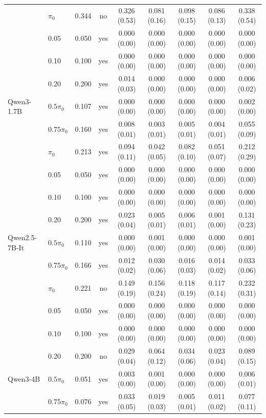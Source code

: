 \begin{table}[H]
\begin{tabular}{llrc ccccc}
 & $\pi_0$ & 0.344 & no & 0.326 (0.53) & 0.081 (0.16) & 0.098 (0.15) & 0.086 (0.13) & 0.338 (0.54) \\
 & 0.05 & 0.050 & yes & 0.000 (0.00) & 0.000 (0.00) & 0.000 (0.00) & 0.000 (0.00) & 0.000 (0.00) \\
 & 0.10 & 0.100 & yes & 0.000 (0.00) & 0.000 (0.00) & 0.000 (0.00) & 0.000 (0.00) & 0.000 (0.00) \\
 & 0.20 & 0.200 & yes & 0.014 (0.03) & 0.000 (0.00) & 0.000 (0.00) & 0.000 (0.00) & 0.006 (0.02) \\
\addlinespace
Qwen3-1.7B & $0.5\pi_0$ & 0.107 & yes & 0.000 (0.00) & 0.000 (0.00) & 0.000 (0.00) & 0.000 (0.00) & 0.002 (0.00) \\
 & $0.75\pi_0$ & 0.160 & yes & 0.008 (0.01) & 0.003 (0.01) & 0.005 (0.01) & 0.004 (0.01) & 0.055 (0.09) \\
 & $\pi_0$ & 0.213 & yes & 0.094 (0.11) & 0.042 (0.05) & 0.082 (0.10) & 0.051 (0.07) & 0.212 (0.29) \\
 & 0.05 & 0.050 & yes & 0.000 (0.00) & 0.000 (0.00) & 0.000 (0.00) & 0.000 (0.00) & 0.000 (0.00) \\
 & 0.10 & 0.100 & yes & 0.000 (0.00) & 0.000 (0.00) & 0.000 (0.00) & 0.000 (0.00) & 0.000 (0.00) \\
 & 0.20 & 0.200 & yes & 0.023 (0.04) & 0.005 (0.01) & 0.006 (0.01) & 0.001 (0.00) & 0.131 (0.23) \\
\addlinespace
Qwen2.5-7B-It & $0.5\pi_0$ & 0.110 & yes & 0.000 (0.00) & 0.001 (0.00) & 0.000 (0.00) & 0.000 (0.00) & 0.001 (0.00) \\
 & $0.75\pi_0$ & 0.166 & yes & 0.012 (0.02) & 0.030 (0.06) & 0.016 (0.03) & 0.014 (0.02) & 0.033 (0.06) \\
 & $\pi_0$ & 0.221 & no & 0.149 (0.19) & 0.156 (0.24) & 0.118 (0.19) & 0.117 (0.14) & 0.232 (0.31) \\
 & 0.05 & 0.050 & yes & 0.000 (0.00) & 0.000 (0.00) & 0.000 (0.00) & 0.000 (0.00) & 0.000 (0.00) \\
 & 0.10 & 0.100 & yes & 0.000 (0.00) & 0.000 (0.00) & 0.000 (0.00) & 0.000 (0.00) & 0.000 (0.00) \\
 & 0.20 & 0.200 & no & 0.029 (0.04) & 0.064 (0.12) & 0.034 (0.06) & 0.023 (0.04) & 0.089 (0.15) \\
\addlinespace
Qwen3-4B & $0.5\pi_0$ & 0.051 & yes & 0.003 (0.00) & 0.001 (0.00) & 0.000 (0.00) & 0.000 (0.00) & 0.006 (0.01) \\
 & $0.75\pi_0$ & 0.076 & yes & 0.033 (0.05) & 0.019 (0.03) & 0.005 (0.01) & 0.011 (0.02) & 0.077 (0.11) \\

\end{tabular}
\end{table}
